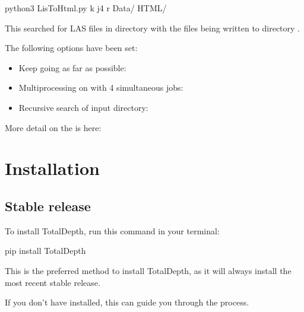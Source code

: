 \documentclass[letterpaper,10pt,english]{sphinxmanual}
\begin{document}
\begin{sphinxVerbatim}[commandchars=\\\{\}]
\PYGZdl{} python3 LisToHtml.py \PYGZhy{}k \PYGZhy{}j4 \PYGZhy{}r Data/ HTML/
\end{sphinxVerbatim}

This searched for LAS files in directory  with the files being written to directory .

The following options have been set:
\begin{itemize}
\item {} 
Keep going as far as possible: 

\item {} 
Multiprocessing on with 4 simultaneous jobs: 

\item {} 
Recursive search of input directory: 

\end{itemize}

More detail on the  is here: {\hyperref[\detokenize{cmd_line_tools/LIS_cmd_line_tools:totaldepth-liscmdline-listohtml}]{}}


\section{Installation}
\label{\detokenize{installation::doc}}\label{\detokenize{installation:installation}}

\subsection{Stable release}
\label{\detokenize{installation:stable-release}}
To install TotalDepth, run this command in your terminal:

\begin{sphinxVerbatim}[commandchars=\\\{\}]
 pip install TotalDepth
\end{sphinxVerbatim}

This is the preferred method to install TotalDepth, as it will always install the most recent stable release.

If you don’t have  installed, this  can guide
you through the process.
\end{document}
